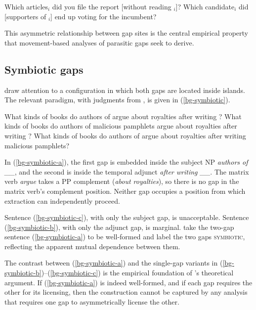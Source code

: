 \documentclass[12pt]{article}
\begin{document}
\pex\label{bg-no-true}
\a \ljudge{*}Which articles$_i$ did you file the report [without reading \underline{\hspace{1em}}$_i$]?
\a \ljudge{*}Which candidate$_i$ did [supporters of \underline{\hspace{1em}}$_i$] end up voting for the incumbent?
\xe

\noindent This asymmetric relationship between gap sites is the central empirical property that movement-based analyses of parasitic gaps seek to derive.

\subsection{Symbiotic gaps}\label{sec:bg-symbiotic}

\citet{levine2003} draw attention to a configuration in which both gaps are located inside islands. The relevant paradigm, with judgments from \citeauthor{levine2003}, is given in (\ref{bg-symbiotic}).

\pex\label{bg-symbiotic}
\a\label{bg-symbiotic-a} What kinds of books do authors of \underline{\hspace{1em}} argue about royalties after writing \underline{\hspace{1em}}?
\a\label{bg-symbiotic-b} What kinds of books do authors of malicious pamphlets argue about royalties after writing \underline{\hspace{1em}}?
\a\label{bg-symbiotic-c} \ljudge{*}What kinds of books do authors of \underline{\hspace{1em}} argue about royalties after writing malicious pamphlets?
\xe

\noindent In (\ref{bg-symbiotic-a}), the first gap is embedded inside the subject NP \emph{authors of \_\_}, and the second is inside the temporal adjunct \emph{after writing \_\_}. The matrix verb \emph{argue} takes a PP complement (\emph{about royalties}), so there is no gap in the matrix verb's complement position. Neither gap occupies a position from which extraction can independently proceed.

Sentence (\ref{bg-symbiotic-c}), with only the subject gap, is unacceptable. Sentence (\ref{bg-symbiotic-b}), with only the adjunct gap, is marginal. \citeauthor{levine2003} take the two-gap sentence (\ref{bg-symbiotic-a}) to be well-formed and label the two gaps \textsc{symbiotic}, reflecting the apparent mutual dependence between them.

The contrast between (\ref{bg-symbiotic-a}) and the single-gap variants in (\ref{bg-symbiotic-b})--(\ref{bg-symbiotic-c}) is the empirical foundation of \citeauthor{levine2003}'s theoretical argument. If (\ref{bg-symbiotic-a}) is indeed well-formed, and if each gap requires the other for its licensing, then the construction cannot be captured by any analysis that requires one gap to asymmetrically license the other.
\end{document}
